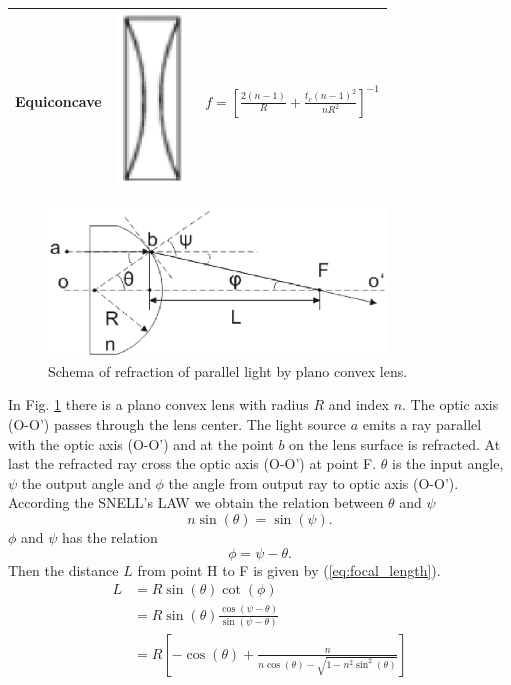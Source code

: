 \begin{table}[!ht]
\begin{tabular}{|c|c|c|}
\hline
Equiconcave & \parbox[c]{2.1cm}{\includegraphics[width=2cm]{bilder/equi_concave}} & $f=\left[\frac{2(n-1)}{R} + \frac{t_{c}(n-1)^2}{nR^2}\right]^{-1}$ \\
\hline
\end{tabular}
\label{tab:lenses_focal_length}
\end{table}
\begin{figure}[!ht]
\centering
\includegraphics[width=0.8\textwidth]{bilder/focal_length}
\caption{Schema of refraction of parallel light by plano convex lens.}
\label{fig:focal_length}
\end{figure}
In Fig. \ref{fig:focal_length} there is a plano convex lens with radius $R$ and index $n$. The optic axis (O-O') passes through the lens center.  The light source $a$ emits a ray parallel with the optic axis (O-O') and at the point $b$ on the lens surface is refracted. At last the refracted ray cross the optic axis (O-O') at point F. $\theta$ is the input angle, $\psi$ the output angle and $\phi$ the angle from output ray to optic axis (O-O'). According the SNELL's LAW we obtain the relation between $\theta$ and $\psi$ 
\begin{equation*}
 n\sin(\theta)=\sin(\psi)\text{.}
\label{eq:snell_focal}
\end{equation*} 
$\phi$ and $\psi$ has the relation
\begin{equation*}
\phi=\psi-\theta \text{.}
\label{eq:psi_phi}
\end{equation*}
Then the distance $L$ from point H to F is given by (\ref{eq:focal_length}). 
\begin{align}
L&=R\sin(\theta)\cot(\phi) \nonumber\\
&=R\sin(\theta)\frac{\cos(\psi-\theta)}{\sin(\psi-\theta)} \nonumber\\
&=R \left[-\cos(\theta)+\frac{n}{n\cos(\theta)-\sqrt{1-n^{2}\sin^{2}(\theta)}} \right]
\label{eq:focal_length}
\end{align}
